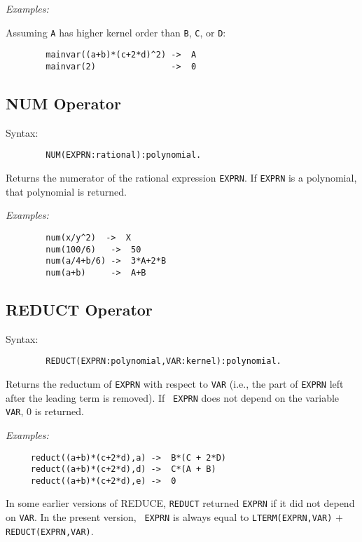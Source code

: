 {\it Examples:}

Assuming {\tt A} has higher kernel order than {\tt B}, {\tt C}, or {\tt D}:
\begin{verbatim}
        mainvar((a+b)*(c+2*d)^2) ->  A
        mainvar(2)               ->  0
\end{verbatim}

\subsection{NUM Operator}

Syntax:
\begin{verbatim}
        NUM(EXPRN:rational):polynomial.
\end{verbatim}
Returns the numerator of the rational expression {\tt EXPRN}.  If {\tt EXPRN}
is a polynomial, that polynomial is returned.

{\it Examples:}
\begin{verbatim}
        num(x/y^2)  ->  X
        num(100/6)   ->  50
        num(a/4+b/6) ->  3*A+2*B
        num(a+b)     ->  A+B
\end{verbatim}

\subsection{REDUCT Operator}

Syntax:
\begin{verbatim}
        REDUCT(EXPRN:polynomial,VAR:kernel):polynomial.
\end{verbatim}
Returns the reductum of {\tt EXPRN} with respect to {\tt VAR} (i.e., the
part of {\tt EXPRN} left after the leading term is removed).  If {\tt
EXPRN} does not depend on the variable {\tt VAR}, 0 is returned.

{\it Examples:}
\begin{verbatim}
     reduct((a+b)*(c+2*d),a) ->  B*(C + 2*D)
     reduct((a+b)*(c+2*d),d) ->  C*(A + B)
     reduct((a+b)*(c+2*d),e) ->  0
\end{verbatim}

{\COMPATNOTE} In some earlier versions of REDUCE, {\tt REDUCT} returned
{\tt EXPRN} if it did not depend on {\tt VAR}.  In the present version, {\tt
EXPRN} is always equal to {\tt LTERM(EXPRN,VAR)} $+$ {\tt
REDUCT(EXPRN,VAR)}.

